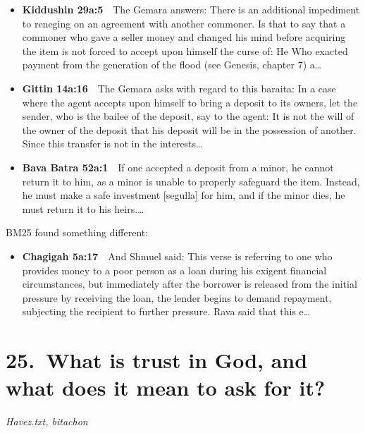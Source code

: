 \documentclass[11pt,a4paper]{article}
\begin{document}
\begin{itemize}[leftmargin=1.2em,itemsep=3pt]
\item {\color{ref}\textbf{Kiddushin 29a:5}}\ \ The Gemara answers: There is an additional impediment to reneging on an agreement with another commoner. Is that to say that a commoner who gave a seller money and changed his mind before acquiring the item is not forced to accept upon himself the curse of: He Who exacted payment from the generation of the flood (see Genesis, chapter 7) a\ldots
\item {\color{ref}\textbf{Gittin 14a:16}}\ \ The Gemara asks with regard to this baraita: In a case where the agent accepts upon himself to bring a deposit to its owners, let the sender, who is the bailee of the deposit, say to the agent: It is not the will of the owner of the deposit that his deposit will be in the possession of another. Since this transfer is not in the interests\ldots
\item {\color{ref}\textbf{Bava Batra 52a:1}}\ \ If one accepted a deposit from a minor, he cannot return it to him, as a minor is unable to properly safeguard the item. Instead, he must make a safe investment [segulla] for him, and if the minor dies, he must return it to his heirs.\ldots
\end{itemize}
{\color{quiet}\small BM25 found something different:}
\begin{itemize}[leftmargin=1.2em]
\item {\color{ref}\textbf{Chagigah 5a:17}}\ \ And Shmuel said: This verse is referring to one who provides money to a poor person as a loan during his exigent financial circumstances, but immediately after the borrower is released from the initial pressure by receiving the loan, the lender begins to demand repayment, subjecting the recipient to further pressure. Rava said that this e\ldots
\end{itemize}

\section*{25.\ What is trust in God, and what does it mean to ask for it?}
{\color{quiet}\small\textit{Havez.txt, bitachon}}
\end{document}
